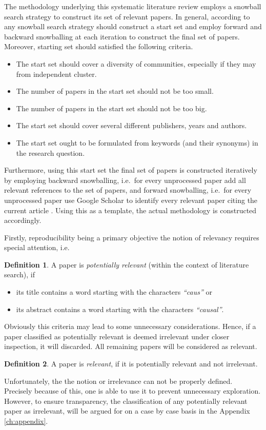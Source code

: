 \documentclass[11pt,a4paper]{book}
\theoremstyle{definition}
\newtheorem{definition}{Definition}[section]
\theoremstyle{definition}
\theoremstyle{definition}
\theoremstyle{remark}
\begin{document}
The methodology underlying this systematic literature review employs a snowball search strategy to construct its set of relevant papers. 
In general, according to \cite{wohlin2014guidelines} any snowball search strategy should construct a start set and employ forward and backward snowballing at each iteration to construct the final set of papers. 
Moreover, starting set should satisfied the following criteria.
\begin{itemize}
\item The start set should cover a diversity of communities, especially if they may from independent cluster.
\item The number of papers in the start set should not be too small.
\item The number of papers in the start set should not be too big.
\item The start set should cover several different publishers, years and authors.
\item The start set ought to be formulated from keywords (and their synonyms) in the research question.
\end{itemize}
Furthermore, using this start set the final set of papers is constructed iteratively by employing backward snowballing, i.e.\ for every unprocessed paper add all relevant references to the set of papers, and forward snowballing, i.e.\ for every unprocessed paper use Google Scholar to identify every relevant paper citing the current article \cite{wohlin2014guidelines}. Using this as a template, the actual methodology is constructed accordingly.


Firstly, reproducibility being a primary objective the notion of relevancy requires special attention, i.e.
\begin{definition}
A paper is \emph{potentially relevant} (within the context of literature search), if
\begin{itemize}
\item  its title contains a word starting with the characters \emph{``caus''} or 
\item  its abstract contains a word starting with the characters \emph{``causal''}. 
\end{itemize}
\end{definition}
Obviously this criteria may lead to some unnecessary considerations. Hence, if a paper classified as potentially relevant is deemed irrelevant under closer inspection, it will discarded. All remaining papers will be considered as relevant. 
\begin{definition}
A paper is \emph{relevant}, if it is potentially relevant and not irrelevant.  
\end{definition}
Unfortunately, the the notion or irrelevance can not be properly defined. Precisely because of this, one is able to use it to prevent unnecessary exploration. However, to ensure transparency, the classification of any potentially relevant paper as irrelevant, will be argued for on a case by case basis in the Appendix \ref{ch:appendix}.
\end{document}
